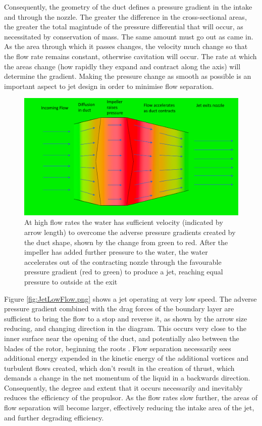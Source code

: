 \documentclass{article}\usepackage[]{graphicx}\usepackage[]{color}
\begin{document}
Consequently, the geometry of the duct defines a pressure gradient in the intake and through the nozzle.  The greater the difference in the cross-sectional areas, the greater the total magintude of the pressure differential that will occur, as necessitated by conservation of mass. The same amount must go out as came in.  As the area through which it passes changes, the velocity much change so that the flow rate remains constant, otherwise cavitation will occur.  The rate at which the areas change (how rapidly they expand and contract along the axis) will determine the gradient.  Making the pressure change as smooth as possible is an important aspect to jet design in order to minimise flow separation.

\begin{figure}
\includegraphics[width=\textwidth]{JetHighFlow.png}
\caption{At high flow rates the water has sufficient velocity (indicated by arrow length) to overcome the adverse pressure gradients created by the duct shape, shown by the change from green to red. After the impeller has added further pressure to the water, the water accelerates out of the contracting nozzle through the favourable pressure gradient (red to green) to produce a jet, reaching equal pressure to outside at the exit}
\label{fig:JetHighFlow.png}
\end{figure}

Figure \ref{fig:JetLowFlow.png} shows a jet operating at very low speed.  The adverse pressure gradient combined with the drag forces of the boundary layer are sufficient to bring the flow to a stop and reverse it, as shown by the arrow size reducing, and changing direction in the diagram.  This occurs very close to the inner surface near the opening of the duct, and potentially also between the blades of the rotor, beginning the roots \parencite[15]{henderson1964}.  Flow separation necessarily sees additional energy expended in the kinetic energy of the additional vortices and turbulent flows created, which don't result in the creation of thrust, which demands a change in the net momentum of the liquid in a backwards direction.  Consequently, the degree and extent that it occurs necessarily and inevitably reduces the efficiency of the propulsor.  As the flow rates slow further, the areas of flow separation will become larger, effectively reducing the intake area of the jet, and further degrading efficiency.
\end{document}
